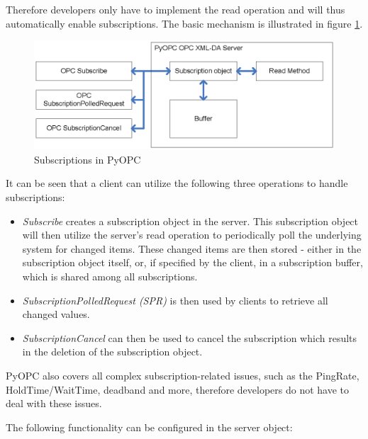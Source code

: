 Therefore developers only have to implement the read operation and will
thus automatically enable subscriptions. The basic mechanism is illustrated
in figure \ref{pyopc_subs}.

\begin{figure}[ht]
\centering
\includegraphics[scale=0.7]{graphics/pyopc_subs.eps}
\caption{Subscriptions in PyOPC}
\label {pyopc_subs} 
\end{figure}

It can be seen that a client can utilize the following three
operations to handle subscriptions:

\begin{itemize}
\item {\sl Subscribe} creates a subscription object in the server.
This subscription object will then utilize the server's read operation
to periodically poll the underlying system for changed items. These
changed items are then stored - either in the subscription object
itself, or, if specified by the client, in a subscription buffer,
which is shared among all subscriptions.
\item {\sl SubscriptionPolledRequest (SPR)} is then used by clients
to retrieve all changed values.
\item {\sl SubscriptionCancel} can then be used to cancel the subscription
which results in the deletion of the subscription object.
\end{itemize}

PyOPC also covers all complex subscription-related issues, such as the
PingRate, HoldTime/WaitTime, deadband and more, therefore developers
do not have to deal with these issues.

The following functionality can be configured in the server object:

